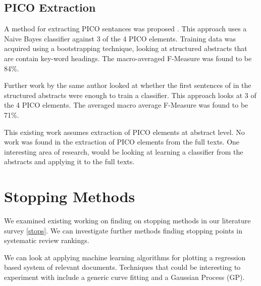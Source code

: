 \subsection{PICO Extraction}

A method for extracting PICO sentances was proposed \cite{Huang2011}. This approach uses a Naive Bayes classifier against 3 of the 4 PICO elements. Training data was acquired using a bootstrapping technique, looking at structured abstracts that are contain key-word headings. The macro-averaged F-Measure was found to be 84\%.

Further work \cite{HUAN2013} by the same author looked at whether the first sentences of in the structured abstracts were enough to train a classifier. This approach looks at 3 of the 4 PICO elements. The averaged macro average F-Measure was found to be 71\%.

This existing work assumes extraction of PICO elements at abstract level. No work was found \cite{Jonnalagadda2015} in the extraction of PICO elements from the full texts. One interesting area of research, would be looking at learning a classifier from the abstracts and applying it to the full texts.



\section{Stopping Methods} \label{sm}

We examined existing working on finding on stopping methods in our literature survey \ref{stops}. We can investigate further methods finding stopping points in systematic review rankings. 

We can look at applying machine learning algorithms for plotting a regression based system of relevant documents. Techniques that could be interesting to experiment with include a generic curve fitting and a Gaussian Process (GP).
